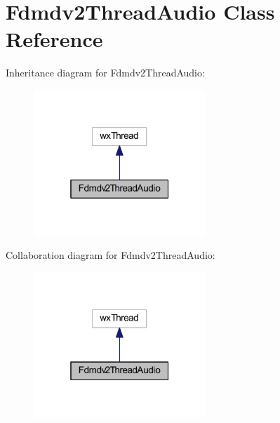 \hypertarget{class_fdmdv2_thread_audio}{\section{Fdmdv2\-Thread\-Audio Class Reference}
\label{class_fdmdv2_thread_audio}
}


Inheritance diagram for Fdmdv2\-Thread\-Audio\-:\nopagebreak
\begin{figure}[H]
\begin{center}
\leavevmode
\includegraphics[width=184pt]{class_fdmdv2_thread_audio__inherit__graph}
\end{center}
\end{figure}


Collaboration diagram for Fdmdv2\-Thread\-Audio\-:\nopagebreak
\begin{figure}[H]
\begin{center}
\leavevmode
\includegraphics[width=184pt]{class_fdmdv2_thread_audio__coll__graph}
\end{center}
\end{figure}
